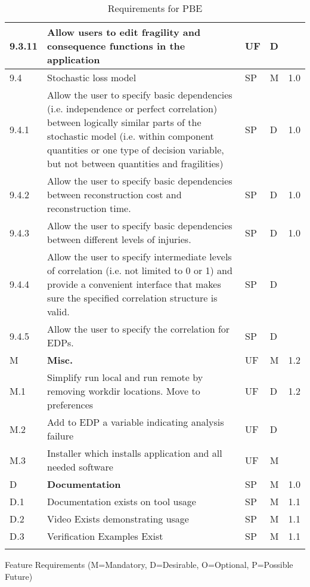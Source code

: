 \begin{longtable}{| p{} | p{} | p{} | p{} |  p{} |}
9.3.11 & Allow users to edit fragility and consequence functions in the application & UF & D &  \\ \hline
9.4 & Stochastic loss model & SP & M & 1.0 \\ \hline
9.4.1 & Allow the user to specify basic dependencies (i.e. independence or perfect correlation) between logically similar parts of the stochastic model (i.e. within component quantities or one type of decision variable, but not between quantities and fragilities) & SP & D & 1.0 \\ \hline
9.4.2 & Allow the user to specify basic dependencies between reconstruction cost and reconstruction time. & SP & D & 1.0 \\ \hline
9.4.3 & Allow the user to specify basic dependencies between different levels of injuries. & SP & D & 1.0 \\ \hline
9.4.4 & Allow the user to specify intermediate levels of correlation (i.e. not limited to 0 or 1) and provide a convenient interface that makes sure the specified correlation structure is valid. & SP & D & \\ \hline   
9.4.5 & Allow the user to specify the correlation for EDPs. & SP & D &  \\ \hline  

 M & \textbf{Misc.} & UF & M & 1.2  \\ \hline
   M.1 & Simplify run local and run remote by removing workdir locations. Move to preferences & UF & D & 1.2  \\ \hline
   M.2 & Add to EDP a variable indicating analysis failure & UF & D &   \\ \hline
   M.3 & Installer which installs application and all needed software & UF & M &   \\ \hline
 D & \textbf{Documentation} &  SP & M & 1.0 \\ \hline
 D.1 & Documentation exists on tool usage & SP & M & 1.1  \\ \hline
 D.2 & Video Exists demonstrating usage & SP & M & 1.1  \\ \hline
 D.3 & Verification Examples Exist & SP & M & 1.1  \\ \hline
  \bottomrule 
\caption{Requirements for PBE}
  \label{tab:featureRequirements}                 
\end{longtable}

Feature Requirements (M=Mandatory, D=Desirable, O=Optional, P=Possible Future)
